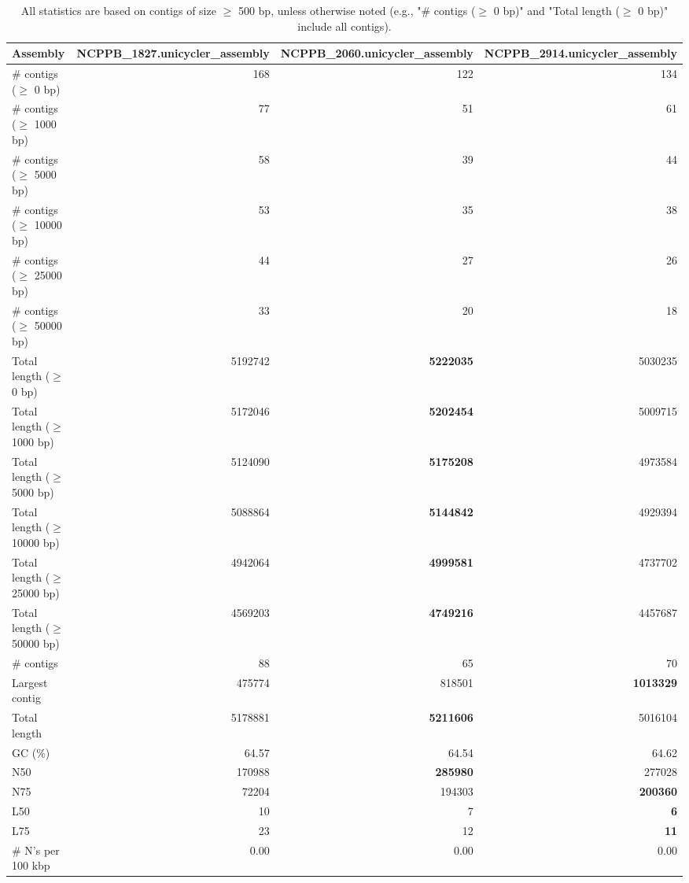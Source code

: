 \documentclass[12pt,a4paper]{article}
\begin{document}
\begin{table}[ht]
\begin{center}
\caption{All statistics are based on contigs of size $\geq$ 500 bp, unless otherwise noted (e.g., "\# contigs ($\geq$ 0 bp)" and "Total length ($\geq$ 0 bp)" include all contigs).}
\begin{tabular}{|l*{3}{|r}|}
\hline
Assembly & NCPPB\_1827.unicycler\_assembly & NCPPB\_2060.unicycler\_assembly & NCPPB\_2914.unicycler\_assembly \\ \hline
\# contigs ($\geq$ 0 bp) & 168 & 122 & 134 \\ \hline
\# contigs ($\geq$ 1000 bp) & 77 & 51 & 61 \\ \hline
\# contigs ($\geq$ 5000 bp) & 58 & 39 & 44 \\ \hline
\# contigs ($\geq$ 10000 bp) & 53 & 35 & 38 \\ \hline
\# contigs ($\geq$ 25000 bp) & 44 & 27 & 26 \\ \hline
\# contigs ($\geq$ 50000 bp) & 33 & 20 & 18 \\ \hline
Total length ($\geq$ 0 bp) & 5192742 & {\bf 5222035} & 5030235 \\ \hline
Total length ($\geq$ 1000 bp) & 5172046 & {\bf 5202454} & 5009715 \\ \hline
Total length ($\geq$ 5000 bp) & 5124090 & {\bf 5175208} & 4973584 \\ \hline
Total length ($\geq$ 10000 bp) & 5088864 & {\bf 5144842} & 4929394 \\ \hline
Total length ($\geq$ 25000 bp) & 4942064 & {\bf 4999581} & 4737702 \\ \hline
Total length ($\geq$ 50000 bp) & 4569203 & {\bf 4749216} & 4457687 \\ \hline
\# contigs & 88 & 65 & 70 \\ \hline
Largest contig & 475774 & 818501 & {\bf 1013329} \\ \hline
Total length & 5178881 & {\bf 5211606} & 5016104 \\ \hline
GC (\%) & 64.57 & 64.54 & 64.62 \\ \hline
N50 & 170988 & {\bf 285980} & 277028 \\ \hline
N75 & 72204 & 194303 & {\bf 200360} \\ \hline
L50 & 10 & 7 & {\bf 6} \\ \hline
L75 & 23 & 12 & {\bf 11} \\ \hline
\# N's per 100 kbp & 0.00 & 0.00 & 0.00 \\ \hline
\end{tabular}
\end{center}
\end{table}
\end{document}
